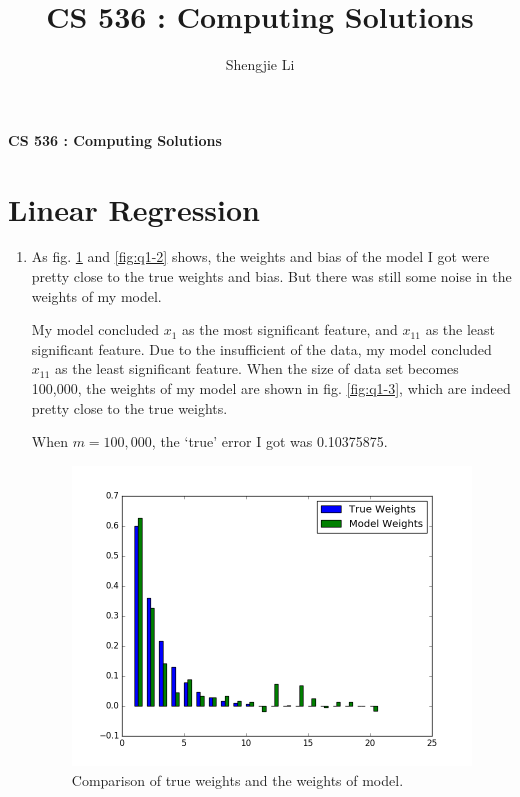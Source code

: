 \documentclass[letter, 12pt]{article}
\author{Shengjie Li}
\title{CS 536 : Computing Solutions}
\begin{document}
    \centerline{\textbf{CS 536 : Computing Solutions}}
    \section{Linear Regression}
    \begin{enumerate}
    	\item {}
    	\par{As fig. \ref{fig:q1-1} and \ref{fig:q1-2} shows, the weights and bias of the model I got were pretty close to the true weights and bias. But there was still some noise in the weights of my model.}
    	\par{My model concluded $ x_1 $ as the most significant feature, and $ x_{11} $ as the least significant feature. Due to the insufficient of the data, my model concluded $ x_{11} $ as the least significant feature. When the size of data set becomes 100,000, the weights of my model are shown in fig. \ref{fig:q1-3}, which are indeed pretty close to the true weights.}
    	\par{When $ m = 100,000 $, the `true' error I got was 0.10375875.}
    	\begin{figure}[H]
    		\centering
    		\begin{minipage}{.48\textwidth}
    			\centering
    			\includegraphics[width=\linewidth]{q1-1.png}
    			\caption{Comparison of true weights and the weights of model.}
    			\label{fig:q1-1}
    		\end{minipage}
	    	\begin{minipage}{.48\textwidth}
		    	\centering

\end{minipage}
\end{figure}
\end{enumerate}
\end{document}
